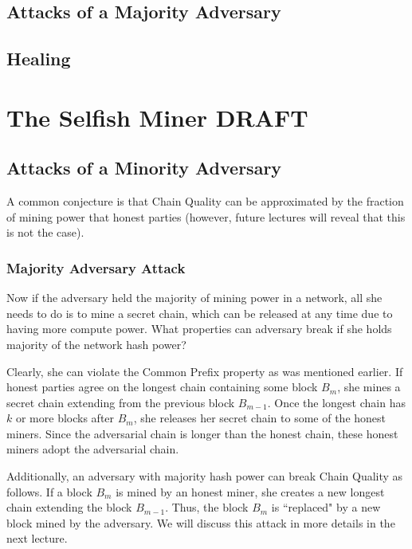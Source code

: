 \section{Attacks of a Majority Adversary}
\section{Healing}

\chapter{The Selfish Miner \small{\textsf{DRAFT}}}

\section{Attacks of a Minority Adversary}
A common conjecture is that Chain Quality can be approximated by the fraction of mining power that honest parties (however, future lectures will reveal that this is not the case).


\subsection{Majority Adversary Attack}
Now if the adversary held the majority of mining power in a network, all she needs to do is to mine a secret chain, which can be released at any time due to having more compute power. What properties can adversary break if she holds majority of the network hash power?

Clearly, she can violate the Common Prefix property as was mentioned earlier. If honest parties agree on the longest chain containing some block $B_m$, she mines a secret chain extending from the previous block $B_{m-1}$. Once the longest chain has $k$ or more blocks after $B_m$, she releases her secret chain to some of the honest miners. Since the adversarial chain is longer than the honest chain, these honest miners adopt the adversarial chain.

Additionally, an adversary with majority hash power can break Chain Quality as follows. If a block $B_m$ is mined by an honest miner, she creates a new longest chain extending the block $B_{m-1}$. Thus, the block $B_m$ is ``replaced" by a new block mined by the adversary. We will discuss this attack in more details in the next lecture.

